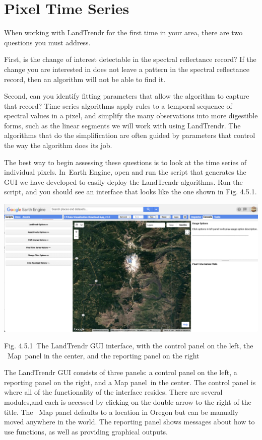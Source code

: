 \documentclass[
  letterpaper,
  DIV=11,
  numbers=noendperiod]{scrreprt}
\begin{document}
\hypertarget{pixel-time-series}{%
\section{Pixel Time Series}\label{pixel-time-series}}

When working with LandTrendr for the first time in your area, there are
two questions you must address. ~

First, is the change of interest detectable in the spectral reflectance
record? If the change you are interested in does not leave a pattern in
the spectral reflectance record, then an algorithm will not be able to
find it. ~

Second, can you identify fitting parameters that allow the algorithm to
capture that record? Time series algorithms apply rules to a temporal
sequence of spectral values in a pixel, and simplify the many
observations into more digestible forms, such as the linear segments we
will work with using LandTrendr. The algorithms that do the
simplification are often guided by parameters that control the way the
algorithm does its job.

The best way to begin assessing these questions is to look at the time
series of individual pixels. In~Earth Engine, open and run the script
that generates the GUI we have developed to easily deploy the LandTrendr
algorithms. Run the script, and you should see an interface that looks
like the one shown in Fig. 4.5.1.

\includegraphics{./F4/image29.png}

Fig. 4.5.1~The LandTrendr GUI interface, with the control panel on the
left, the ~Map~panel in the center, and the reporting panel on the right

The LandTrendr GUI consists of three panels: a control panel on the
left, a reporting panel on the right, and a Map panel~in the center. The
control panel is where all of the functionality of the interface
resides. There are several modules,and each is accessed by clicking on
the double arrow to the right of the title. The ~Map panel defaults to a
location in Oregon but can be manually moved anywhere in the world. The
reporting panel shows messages about how to use functions, as well as
providing graphical outputs.
\end{document}
